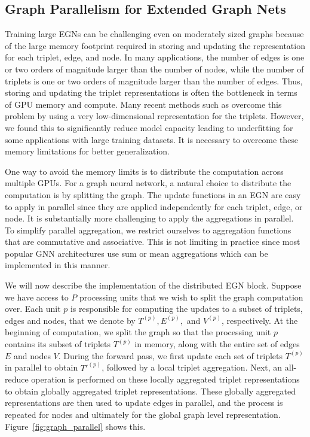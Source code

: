 \documentclass{article} \usepackage{iclr2022_conference,times}
\begin{document}
\subsection{Graph Parallelism for Extended Graph Nets}
\label{sec:gp-egn}

Training large EGNs can be challenging even on moderately sized graphs because of the large memory footprint required in storing and updating the representation for each triplet, edge, and node. In many applications, the number of edges is one or two orders of magnitude larger than the number of nodes, while the number of triplets is one or two orders of magnitude larger than the number of edges. Thus, storing and updating the triplet representations is often the bottleneck in terms of GPU memory and compute. Many recent methods such as \citep{klicpera_dimenetpp_2020,klicpera2021gemnet} overcome this problem by using a very low-dimensional representation for the triplets. However, we found this to significantly reduce model capacity leading to underfitting for some applications with large training datasets. It is necessary to overcome these memory limitations for better generalization.

One way to avoid the memory limits is to distribute the computation across multiple GPUs. For a graph neural network, a natural choice to distribute the computation is by splitting the graph.
The update functions in an EGN are easy to apply in parallel since they are applied independently for each triplet, edge, or node. It is substantially more challenging to apply the aggregations in parallel. To simplify parallel aggregation, we restrict ourselves to aggregation functions that are commutative and associative. This is not limiting in practice since most popular GNN architectures use sum or mean aggregations which can be implemented in this manner.

We will now describe the implementation of the distributed EGN block. Suppose we have access to $P$ processing units that we wish to split the graph computation over. Each unit $p$ is responsible for computing the updates to a subset of triplets, edges and nodes, that we denote by $T^{(p)}, E^{(p)},$ and $V^{(p)}$, respectively. At the beginning of computation, we split the graph so that the processing unit $p$ contains its subset of triplets $T^{(p)}$ in memory, along with the entire set of edges $E$ and nodes $V$. During the forward pass, we first update each set of triplets $T^{(p)}$ in parallel to obtain $T'^{(p)}$, followed by a local triplet aggregation. Next, an all-reduce operation is performed on these locally aggregated triplet representations to obtain globally aggregated triplet representations. These globally aggregated representations are then used to update edges in parallel, and the process is repeated for nodes and ultimately for the global graph level representation.
Figure~\ref{fig:graph_parallel} shows this.
\end{document}
